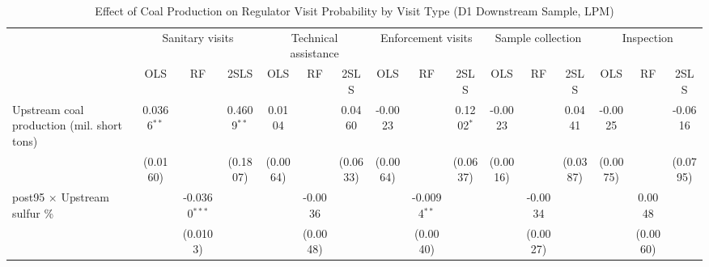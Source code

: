 
\begin{table}[htbp]
   
   \caption{\label{tab:h2_snsv_d12_ivsumcoaltons} Effect of Coal Production on Regulator Visit Probability by Visit Type (D1 Downstream Sample, LPM)}
   \bigskip
   
   \centering
   
   \begin{adjustbox}{width = \textwidth, center}
      
      
      \begin{tabular}{lccccccccccccccc}
         \toprule
         
          & \multicolumn{3}{c}{Sanitary visits} & \multicolumn{3}{c}{Technical assistance} & \multicolumn{3}{c}{Enforcement visits} & \multicolumn{3}{c}{Sample collection} & \multicolumn{3}{c}{Inspection}\\
         
                                                                                   & OLS           & RF              & 2SLS          & OLS           & RF            & 2SLS          & OLS           & RF             & 2SLS          & OLS           & RF            & 2SLS          & OLS           & RF            & 2SLS\\  
         
         \midrule 
         Upstream coal production (mil. short tons)                                & 0.0366$^{**}$ &                 & 0.4609$^{**}$ & 0.0104        &               & 0.0460        & -0.0023       &                & 0.1202$^{*}$  & -0.0023       &               & 0.0441        & -0.0025       &               & -0.0616\\   
                                                                                   & (0.0160)      &                 & (0.1807)      & (0.0064)      &               & (0.0633)      & (0.0064)      &                & (0.0637)      & (0.0016)      &               & (0.0387)      & (0.0075)      &               & (0.0795)\\   
         post95 $\times$ Upstream sulfur \%                                        &               & -0.0360$^{***}$ &               &               & -0.0036       &               &               & -0.0094$^{**}$ &               &               & -0.0034       &               &               & 0.0048        &   \\   
                                                                                   &               & (0.0103)        &               &               & (0.0048)      &               &               & (0.0040)       &               &               & (0.0027)      &               &               & (0.0060)      &   \\   
         

\end{tabular}
\end{adjustbox}
\end{table}
